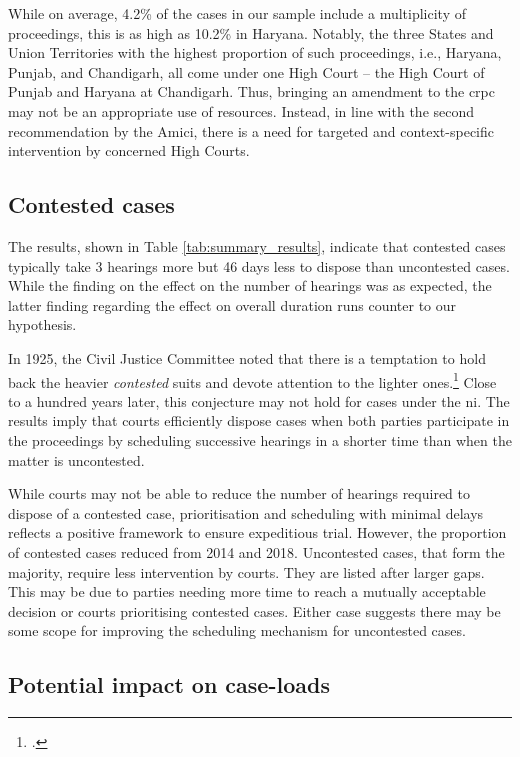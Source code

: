 While on average, 4.2\% of the cases in our sample include a multiplicity of proceedings, this is as high as 10.2\% in Haryana. Notably, the three States and Union Territories with the highest proportion of such proceedings, i.e., Haryana, Punjab, and Chandigarh, all come under one High Court -- the High Court of Punjab and Haryana at Chandigarh. Thus, bringing an amendment to the \gls{crpc} may not be an appropriate use of resources. Instead, in line with the second recommendation by the Amici, there is a need for targeted and context-specific intervention by concerned High Courts.

\subsection{Contested cases}
\label{sec:contested-cases}

The results, shown in Table \ref{tab:summary_results}, indicate that contested cases typically take 3 hearings more but 46 days less to dispose than uncontested cases. While the finding on the effect on the number of hearings was as expected, the latter finding regarding the effect on overall duration runs counter to our hypothesis.

In 1925, the Civil Justice Committee noted that there is a temptation to hold back the heavier \textit{contested} suits and devote attention to the lighter ones.\footcite{cg1925_civiljustice} Close to a hundred years later, this conjecture may not hold for cases under the \gls{ni}. The results imply that courts efficiently dispose cases when both parties participate in the proceedings by scheduling successive hearings in a shorter time than when the matter is uncontested.

While courts may not be able to reduce the number of hearings required to dispose of a contested case, prioritisation and scheduling with minimal delays reflects a positive framework to ensure expeditious trial. However, the proportion of contested cases reduced from 2014 and 2018. Uncontested cases, that form the majority, require less intervention by courts. They are listed after larger gaps. This may be due to parties needing more time to reach a mutually acceptable decision or courts prioritising contested cases. Either case suggests there may be some scope for improving the scheduling mechanism for uncontested cases.

\subsection{Potential impact on case-loads} \label{sec:impact-case-loads}

